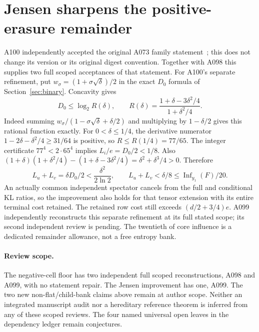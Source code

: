 \documentclass[11pt]{article}
\begin{document}
\section{Jensen sharpens the positive-erasure remainder}
\label{sec:jensen}
A100 independently accepted the original A073 family statement~\cite{A100e}; this
does not change its version or its original digest convention. Together
with A098 this supplies two full scoped acceptances of that statement.
For A100's separate refinement, put $w_\sigma=(1+\sigma\sqrt\delta)/2$
in the exact $D_0$ formula of Section~\ref{sec:binary}. Concavity gives
\[
 D_0\le\log_2R(\delta),\qquad
 R(\delta)=\frac{1+\delta-3\delta^2/4}{1+\delta^2/4}.
\]
Indeed summing $w_\sigma/(1-\sigma\sqrt\delta+\delta/2)$ and
multiplying by $1-\delta/2$ gives this rational function exactly.
For $0<\delta\le1/4$, the derivative numerator
$1-2\delta-\delta^2/4\ge31/64$ is positive, so
$R\le R(1/4)=77/65$. The integer certificate $77^4<2\cdot65^4$
implies $L_i/e=D_0/2<1/8$. Also
$(1+\delta)(1+\delta^2/4)-(1+\delta-3\delta^2/4)
=\delta^2+\delta^3/4>0$. Therefore
\[
 L_u+L_v=\delta D_0/2<\frac{\delta^2}{2\ln2},\qquad
 L_u+L_v<\delta/8\le\operatorname{Inf}_{y_1}(F)/20.
\]
An actually common independent spectator cancels from the full and
conditional KL ratios, so the improvement also holds for that tensor
extension with its entire terminal cost retained. The retained row cost
still exceeds $(d/2+3/4)e$. A099 independently reconstructs this separate
refinement at its full stated scope; its second independent review is
pending. The twentieth of core influence is a dedicated remainder
allowance, not a free entropy bank.

\paragraph{Review scope.}
The negative-cell floor has two independent full scoped reconstructions,
A098 and A099, with no statement repair. The Jensen improvement has one,
A099. The two new non-flat/child-bank claims above remain at author scope.
Neither an integrated manuscript audit nor a hereditary reference theorem
is inferred from any of these scoped reviews. The four named universal
open leaves in the dependency ledger remain conjectures.
\end{document}
